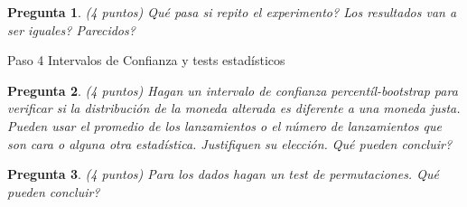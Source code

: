 \documentclass{article}
\newtheorem{pregunta}{Pregunta}
\begin{document}
\begin{pregunta} (4 puntos)
Qué pasa si repito el experimento? Los resultados van a ser iguales? Parecidos?
\end{pregunta}

\begin{topbot}
  \vspace{0.7em}
  Paso 4 \quad Intervalos de Confianza y tests estadísticos
  \vspace{0.7em}
\end{topbot}

\begin{pregunta} (4 puntos)
Hagan un intervalo de confianza percentíl-bootstrap para verificar si la distribución de la moneda alterada es diferente a una moneda justa. Pueden usar el promedio de los lanzamientos o el número de lanzamientos que son cara o alguna otra estadística. Justifiquen su elección. Qué pueden concluir?
\end{pregunta}

\begin{pregunta} (4 puntos)
  Para los dados hagan un test de permutaciones. Qué pueden concluir?
\end{pregunta}
\end{document}
